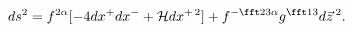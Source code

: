 \begin{equation}
ds^2=f^{2\alpha}[-4dx^+dx^-+{\cal H}dx^{+\,2}]+f^{-\fft23\alpha}g^{\fft13}
d\vec z\,^2.
\label{eq:8met}
\end{equation}

